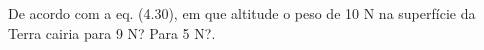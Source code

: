 De acordo com a eq. (4.30), em que altitude o peso de 10 N na superfície da Terra cairia para 9 N? Para 5 N?.

